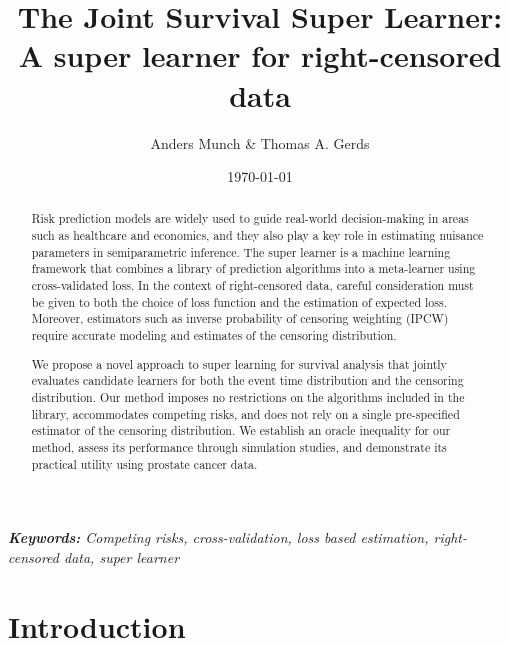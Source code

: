 \documentclass[a4paper,danish]{article}
\title{The Joint Survival Super Learner: A super learner for right-censored
  data}
\author{Anders Munch \& Thomas A. Gerds}
\date{\today}
\theoremstyle{plain} %
\numberwithin{theorem}{section}
\theoremstyle{definition} %
\theoremstyle{remark}
\newcommand{\1}{\mathds{1}}
\begin{document}
\maketitle


\begin{abstract} Risk prediction models are widely used to guide
real-world decision-making in areas such as healthcare and economics,
and they also play a key role in estimating nuisance parameters in
semiparametric inference. The super learner is a machine learning
framework that combines a library of prediction algorithms into a
meta-learner using cross-validated loss. In the context of
right-censored data, careful consideration must be given to both the
choice of loss function and the estimation of expected loss. Moreover,
estimators such as inverse probability of censoring weighting (IPCW)
require accurate modeling and estimates of the censoring distribution.

We propose a novel approach to super learning for survival analysis
that jointly evaluates candidate learners for both the event time
distribution and the censoring distribution. Our method imposes no
restrictions on the algorithms included in the library, accommodates
competing risks, and does not rely on a single pre-specified estimator
of the censoring distribution. We establish an oracle inequality for
our method, assess its performance through simulation studies, and
demonstrate its practical utility using prostate cancer data.
\end{abstract}

\textit{\textbf{Keywords:} Competing risks, cross-validation,
  loss based estimation, right-censored data, super learner}

\section{Introduction}
\label{sec:introduction}
\end{document}
